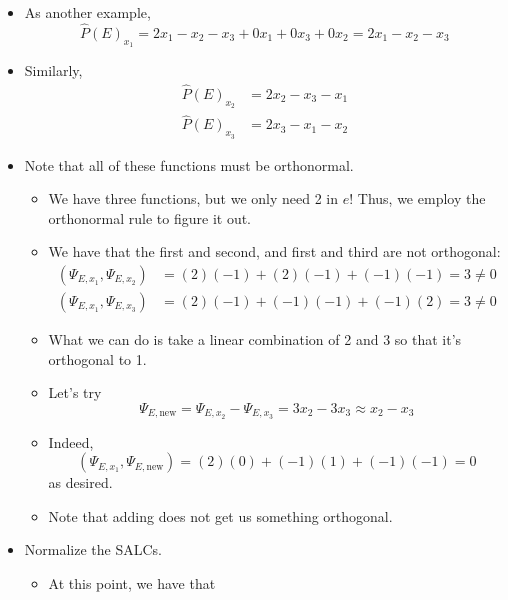 \documentclass[../notes.tex]{subfiles}
\begin{document}
\begin{itemize}
\begin{itemize}
\begin{itemize}
        \end{itemize}
        \item As another example,
        \begin{equation*}
            \hat{P}(E)_{x_1} = 2x_1-x_2-x_3+0x_1+0x_3+0x_2
            = 2x_1-x_2-x_3
        \end{equation*}
        \item Similarly,
        \begin{align*}
            \hat{P}(E)_{x_2} &= 2x_2-x_3-x_1\\
            \hat{P}(E)_{x_3} &= 2x_3-x_1-x_2
        \end{align*}
        \item Note that all of these functions must be orthonormal.
        \begin{itemize}
            \item We have three functions, but we only need 2 in $e$! Thus, we employ the orthonormal rule to figure it out.
            \item We have that the first and second, and first and third are not orthogonal:
            \begin{align*}
                (\Psi_{E,x_1},\Psi_{E,x_2}) &= (2)(-1)+(2)(-1)+(-1)(-1) = 3 \neq 0\\
                (\Psi_{E,x_1},\Psi_{E,x_3}) &= (2)(-1)+(-1)(-1)+(-1)(2) = 3 \neq 0
            \end{align*}
            \item What we can do is take a linear combination of 2 and 3 so that it's orthogonal to 1.
            \item Let's try
            \begin{equation*}
                \Psi_{E,\text{new}} = \Psi_{E,x_2}-\Psi_{E,x_3}
                = 3x_2-3x_3
                \approx x_2-x_3
            \end{equation*}
            \item Indeed,
            \begin{equation*}
                (\Psi_{E,x_1},\Psi_{E,\text{new}}) = (2)(0)+(-1)(1)+(-1)(-1) = 0
            \end{equation*}
            as desired.
            \item Note that adding does not get us something orthogonal.
        \end{itemize}
        \item Normalize the SALCs.
        \begin{itemize}
            \item At this point, we have that

\end{itemize}
\end{itemize}
\end{itemize}
\end{document}
